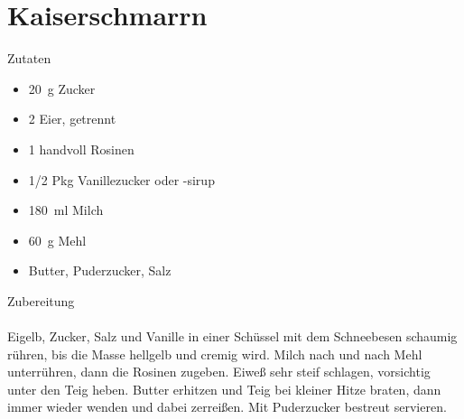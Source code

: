 \section*{Kaiserschmarrn}
\ihead{}\ohead{}
\cfoot{}
{\Large Zutaten}
\begin{multicols}{2}
\begin{itemize}
    \item \SI{20}{g} Zucker
    \item \num{2} Eier, getrennt
    \item \num{1} handvoll Rosinen
    \item \num{1/2} Pkg Vanillezucker oder -sirup
    \item \SI{180}{ml} Milch
    \item \SI{60}{g} Mehl
    \item Butter, Puderzucker, Salz
\end{itemize}
\end{multicols}
\noindent
{\Large Zubereitung}\\
\\
Eigelb, Zucker, Salz und Vanille in einer Schüssel mit dem Schneebesen schaumig rühren, bis die Masse hellgelb und cremig wird.
Milch nach und nach Mehl unterrühren, dann die Rosinen zugeben.
Eiweß sehr steif schlagen, vorsichtig unter den Teig heben.
Butter erhitzen und Teig bei kleiner Hitze braten, dann immer wieder wenden und dabei zerreißen.
Mit Puderzucker bestreut servieren. 